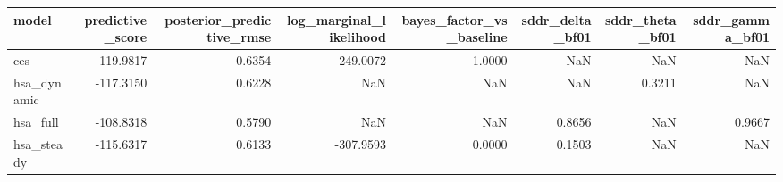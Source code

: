 \begin{tabular}{lrrrrrrr}
\toprule
model & predictive\_score & posterior\_predictive\_rmse & log\_marginal\_likelihood & bayes\_factor\_vs\_baseline & sddr\_delta\_bf01 & sddr\_theta\_bf01 & sddr\_gamma\_bf01 \\
\midrule
ces & -119.9817 & 0.6354 & -249.0072 & 1.0000 & NaN & NaN & NaN \\
hsa\_dynamic & -117.3150 & 0.6228 & NaN & NaN & NaN & 0.3211 & NaN \\
hsa\_full & -108.8318 & 0.5790 & NaN & NaN & 0.8656 & NaN & 0.9667 \\
hsa\_steady & -115.6317 & 0.6133 & -307.9593 & 0.0000 & 0.1503 & NaN & NaN \\
\bottomrule
\end{tabular}
